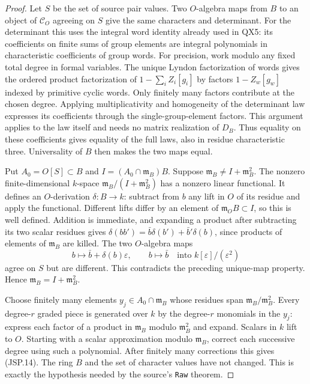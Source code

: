 \begin{proof}
Let $S$ be the set of source pair values. Two $O$-algebra maps
from $B$ to an object of $\mathcal C_O$ agreeing on $S$ give
the same characters and determinant. For the determinant this
uses the integral word identity already used in QX5: its
coefficients on finite sums of group elements are integral
polynomials in characteristic coefficients of group words.
For precision, work modulo any fixed total degree in formal
variables. The unique Lyndon factorization of words gives the
ordered product factorization of
$1-\sum_i Z_i[g_i]$ by factors $1-Z_w[g_w]$ indexed by
primitive cyclic words. Only finitely many factors contribute
at the chosen degree. Applying multiplicativity and homogeneity
of the determinant law expresses its coefficients through
the single-group-element factors. This argument applies to
the law itself and needs no matrix realization of $D_B$.
Thus equality on these coefficients gives equality of the full
laws, also in residue characteristic three. Universality of $B$
then makes the two maps equal.

Put $A_0=O[S]\subset B$ and
$I=(A_0\cap\mathfrak m_B)B$. Suppose
$\mathfrak m_B\ne I+\mathfrak m_B^2$.
The nonzero finite-dimensional $k$-space
$\mathfrak m_B/(I+\mathfrak m_B^2)$ has a nonzero linear
functional. It defines an $O$-derivation $\delta:B\to k$:
subtract from $b$ any lift in $O$ of its residue and apply the
functional. Different lifts differ by an element of
$\mathfrak m_O B\subset I$, so this is well defined.
Addition is immediate, and expanding a product after subtracting
its two scalar residues gives
$\delta(bb')=\bar b\delta(b')+\bar b'\delta(b)$, since
products of elements of $\mathfrak m_B$ are killed.
The two $O$-algebra maps
\[
 b\longmapsto\bar b+\delta(b)\varepsilon,
 \qquad b\longmapsto\bar b
 \quad\text{into }k[\varepsilon]/(\varepsilon^2)
\]
agree on $S$ but are different. This contradicts the preceding
unique-map property. Hence $\mathfrak m_B=I+\mathfrak m_B^2$.

Choose finitely many elements $y_j\in A_0\cap\mathfrak m_B$
whose residues span $\mathfrak m_B/\mathfrak m_B^2$.
Every degree-$r$ graded piece is generated over $k$ by the
degree-$r$ monomials in the $y_j$: express each factor of a
product in $\mathfrak m_B$ modulo $\mathfrak m_B^2$ and
expand. Scalars in $k$ lift to $O$. Starting with a scalar
approximation modulo $\mathfrak m_B$, correct each successive
degree using such a polynomial. After finitely many corrections
this gives (JSP.14). The ring $B$ and the set of character
values have not changed. This is exactly the hypothesis needed
by the source's \texttt{Raw} theorem.
\end{proof}

